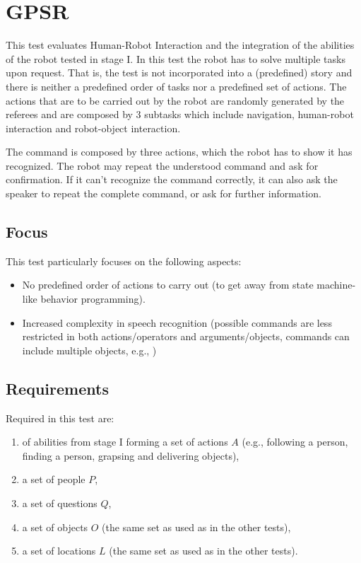 \section{GPSR}

This test evaluates Human-Robot Interaction and the integration of the abilities of the robot tested in stage I. In this test the robot has to solve multiple tasks upon request. That is, the test is not incorporated into a (predefined) story and there is neither a predefined order of tasks nor a predefined set of actions. The actions that are to be carried out by the robot are randomly generated by the referees and are composed by 3 subtasks which include navigation, human-robot interaction and robot-object interaction.

The command is composed by three actions, which the robot has to show it has recognized. The robot may repeat the understood command and ask for confirmation. If it can't recognize the command correctly, it can also ask the speaker to repeat the complete command, or ask for further information.

\subsection{Focus}
This test particularly focuses on the following aspects:
\begin{itemize}
	\item No predefined order of actions to carry out (to get away from state machine-like behavior programming).
	\item Increased complexity in speech recognition (possible commands are less restricted in both actions/operators and arguments/objects, commands can include multiple objects, e.g., )
\end{itemize}

\subsection{Requirements}
Required in this test are:
\begin{enumerate}
	\item of abilities from stage I  forming a set of actions $A$ (e.g., following a person, finding a person, grapsing and delivering objects),
	\item a set of people $P$,
	\item a set of questions $Q$,
	\item a set of objects $O$ (the same set as used as in the other tests),
	\item a set of locations $L$ (the same set as used as in the other tests).
\end{enumerate}

